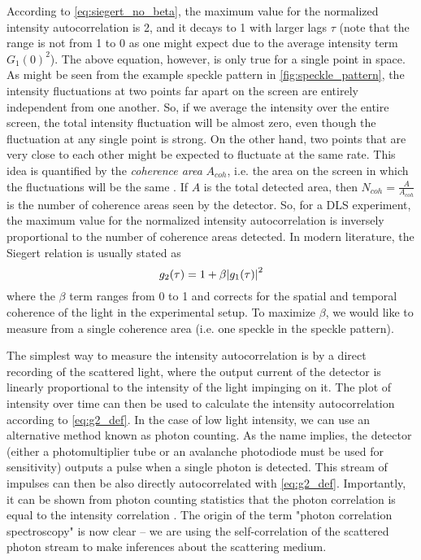 According to \autoref{eq:siegert_no_beta}, the maximum value for the normalized intensity autocorrelation is 2, and it decays to 1 with larger lags $\tau$ (note that the range is not from 1 to 0 as one might expect due to the average intensity term $G_1(0)^2$). The above equation, however, is only true for a single point in space. As might be seen from the example speckle pattern in \autoref{fig:speckle_pattern}, the intensity fluctuations at two points far apart on the screen are entirely independent from one another. So, if we average the intensity over the entire screen, the total intensity fluctuation will be almost zero, even though the fluctuation at any single point is strong. On the other hand, two points that are very close to each other might be expected to fluctuate at the same rate. This idea is quantified by the \emph{coherence area} $A_{coh}$, i.e. the area on the screen in which the fluctuations will be the same \cite[ch. 2.3.3]{Pecora1985}. If $A$ is the total detected area, then $N_{coh} = \frac{A}{A_{coh}}$ is the number of coherence areas seen by the detector. So, for a DLS experiment, the maximum value for the normalized intensity autocorrelation is inversely proportional to the number of coherence areas detected. In modern literature, the Siegert relation is usually stated as
\begin{equation} \label{eq:siegert}
g_2(\tau) = 1+\beta\abs{g_1(\tau)}^2
\end{equation}
where the $\beta$ term ranges from 0 to 1 and corrects for the spatial and temporal coherence of the light in the experimental setup. To maximize $\beta$, we would like to measure from a single coherence area (i.e. one speckle in the speckle pattern).

The simplest way to measure the intensity autocorrelation is by a direct recording of the scattered light, where the output current of the detector is linearly proportional to the intensity of the light impinging on it. The plot of intensity over time can then be used to calculate the intensity autocorrelation according to \autoref{eq:g2_def}. In the case of low light intensity, we can use an alternative method known as photon counting. As the name implies, the detector (either a photomultiplier tube or an avalanche photodiode must be used for sensitivity) outputs a pulse when a single photon is detected. This stream of impulses can then be also directly autocorrelated with \autoref{eq:g2_def}. Importantly, it can be shown from photon counting statistics that the photon correlation is equal to the intensity correlation \cite[ch. 2.3.2.3]{Brown1993}. The origin of the term "photon correlation spectroscopy" is now clear -- we are using the self-correlation of the scattered photon stream to make inferences about the scattering medium.

